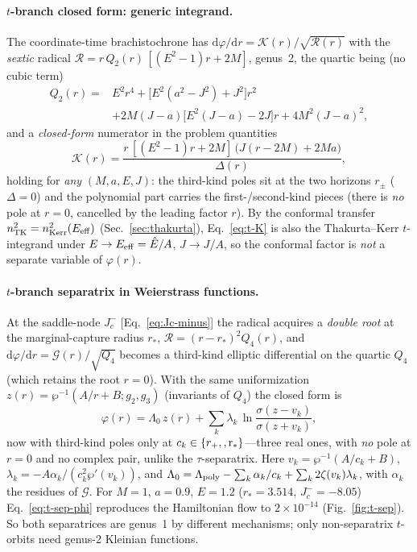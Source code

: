 \documentclass[
    aps, prd, twocolumn, superscriptaddress,
    showpacs, nofootinbib, floatfix
]{revtex4-2}
\newcommand{\Ehat}{\hat E}
\newcommand{\rp}{r_{+}}
\newcommand{\dd}{\mathrm{d}}
\begin{document}
\paragraph{$t$-branch closed form: generic integrand.} The coordinate-time
brachistochrone has $\dd\varphi/\dd r=\mathcal K(r)/\sqrt{\mathcal R(r)}$ with the
\emph{sextic} radical $\mathcal R=r\,Q_2(r)\,[(E^2-1)r+2M]$, genus~2, the quartic
being (no cubic term)
\begin{equation}
\begin{split}
    Q_2(r)={}&E^2r^4+\big[E^2(a^2-J^2)+J^2\big]r^2\\
      &+2M(J-a)\big[E^2(J-a)-2J\big]r+4M^2(J-a)^2,
\end{split}
    \label{eq:t-Q2}
\end{equation}
and a \emph{closed-form} numerator in the problem quantities
\begin{equation}
    \mathcal K(r)=\frac{r\,[(E^2-1)r+2M]\,\big(J(r-2M)+2Ma\big)}{\Delta(r)},
    \label{eq:t-K}
\end{equation}
holding for \emph{any} $(M,a,E,J)$: the third-kind poles sit at the two horizons
$r_\pm$ ($\Delta=0$) and the polynomial part carries the first-/second-kind
pieces (there is \emph{no} pole at $r=0$, cancelled by the leading factor $r$).
By the conformal transfer $n^2_{\rm TK}=n^2_{\rm Kerr}(E_{\rm eff})$
(Sec.~\ref{sec:thakurta}), Eq.~\eqref{eq:t-K} is also the Thakurta--Kerr
$t$-integrand under $E\to E_{\rm eff}=\Ehat/A$, $J\to J/A$, so the conformal
factor is \emph{not} a separate variable of $\varphi(r)$.

\paragraph{$t$-branch separatrix in Weierstrass functions.} At the saddle-node
$J_c^-$ [Eq.~\eqref{eq:Jc-minus}] the radical acquires a
\emph{double root} at the marginal-capture radius $r_*$,
$\mathcal R=(r-r_*)^2 Q_4(r)$, and
$\dd\varphi/\dd r=\mathcal G(r)/\sqrt{Q_4}$ becomes a third-kind elliptic
differential on the quartic $Q_4$ (which retains the root $r=0$). With the same
uniformization $z(r)=\wp^{-1}(A/r+B;g_2,g_3)$ (invariants of $Q_4$) the closed
form is
\begin{equation}
    \varphi(r)=\Lambda_0\,z(r)+\sum_{k}\lambda_k\,
      \ln\frac{\sigma(z-v_k)}{\sigma(z+v_k)},
    \label{eq:t-sep-phi}
\end{equation}
now with third-kind poles only at $c_k\in\{\rp,\rm,r_*\}$---three real ones, with
\emph{no} pole at $r=0$ and no complex pair, unlike the $\tau$-separatrix. Here
$v_k=\wp^{-1}(A/c_k+B)$, $\lambda_k=-A\alpha_k/(c_k^2\wp'(v_k))$, and
$\Lambda_0=\Lambda_{\rm poly}-\sum_k\alpha_k/c_k+\sum_k 2\zeta(v_k)\lambda_k$,
with $\alpha_k$ the residues of $\mathcal G$. For $M=1$, $a=0.9$, $E=1.2$
($r_*=3.514$, $J_c^-=-8.05$) Eq.~\eqref{eq:t-sep-phi} reproduces the Hamiltonian
flow to $2\times10^{-14}$ (Fig.~\ref{fig:t-sep}). So both separatrices are
genus~1 by different mechanisms; only non-separatrix $t$-orbits need genus-2
Kleinian functions.
\end{document}
